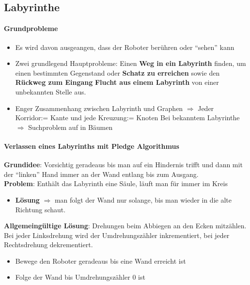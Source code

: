 \subsection{Labyrinthe}
\paragraph{Grundprobleme}
\begin{itemize}
	\item Es wird davon ausgeangen, dass der Roboter berühren oder \enquote{sehen} kann
	\item Zwei grundlegend Hauptprobleme:
	\subitem Einen \textbf{Weg in ein Labyrinth} finden, um einen bestimmten Gegenstand oder \textbf{Schatz zu erreichen} sowie den \textbf{Rückweg zum Eingang}
	\subitem \textbf{Flucht aus einem Labyrinth} von einer unbekannten Stelle aus.
	\item Enger Zusammenhang zwischen Labyrinth und Graphen $\Rightarrow$ Jeder Korridor:= Kante und jede Kreuzung:= Knoten
	\subitem Bei bekanntem Labyrinthe $\Rightarrow$ Suchproblem auf in Bäumen
\end{itemize}
\paragraph{Verlassen eines Labyrinths mit Pledge Algorithmus}
\textbf{Grundidee}: Vorsichtig geradeaus bis man auf ein Hindernis trifft und dann mit der \enquote{linken} Hand immer an der Wand entlang bis zum Ausgang.\\
\textbf{Problem}: Enthält das Labyrinth eine Säule, läuft man für immer im Kreis
\begin{itemize}
	\item \textbf{Lösung} $\Rightarrow$ man folgt der Wand nur solange, bis man wieder in die alte Richtung schaut.
\end{itemize}
\textbf{Allgemeingültige Lösung}: Drehungen beim Abbiegen an den Ecken mitzählen.
Bei jeder Linksdrehung wird der Umdrehungszähler inkrementiert, bei jeder Rechtsdrehung dekrementiert.
\begin{itemize}
	\item Bewege den Roboter geradeaus bis eine Wand erreicht ist
	\item Folge der Wand bis Umdrehungszähler 0 ist
\end{itemize}
